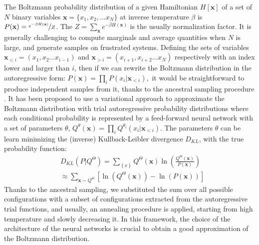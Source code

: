\documentclass[aps,physrev,10pt,floatfix,reprint]{revtex4-2}
\begin{document}
The Boltzmann probability distribution of a given Hamiltonian $H[\mathbf{x}]$ of a set of $N$ binary variables $\mathbf{x}=\{x_1, x_2,...x_N\}$ at inverse temperature $\beta$ is $P(\mathbf{x}) = \nicefrac{e^{-\beta H\left(\mathbf{x}\right)}}{Z}$. The $Z=\sum_{\mathbf{x}}e^{-\beta H\left(\mathbf{x}\right)}$ is the usually normalization factor.
It is generally challenging to compute marginals and average quantities when $N$ is large, and generate samples on frustrated systems. Defining the sets of variables $\mathbf{x}_{<i}=\left(x_{1},x_{2}\dots x_{i-1}\right)$ and $\mathbf{x}_{>i}=\left(x_{i+1},x_{i+2}\dots x_{N}\right)$ respectively with an index lower and larger than $i$, then if we can rewrite the Boltzmann distribution in the autoregressive form:
$
P\left(\mathbf{x}\right)=\prod_{i}P\left(x_{i}|\mathbf{x}_{<i}\right),
$
it would be straightforward to produce independent samples from it, thanks to the ancestral sampling procedure \cite{Wu2019}. It has been proposed \cite{Wu2019} to use a variational approach to approximate the Boltzmann distribution with trial autoregressive probability distributions where each conditional probability is represented by a feed-forward neural network with a set of parameters ${\theta}$,
$
Q^{\theta}\left(\mathbf{x}\right)=\prod_{i}Q^{\theta_i}\left(x_{i}|\mathbf{x}_{<i}\right)
$.
The parameters ${\theta}$ can be learn minimizing the (inverse) Kullback-Leibler divergence $D_{KL}$,
with the true probability function:
\begin{equation}
\begin{split}
& D_{KL}\left(P|Q^{\Theta}\right) =  \sum_{\left\{ x\right\} }Q^{\Theta}\left(\mathbf{x} \right)\ln\left(\frac{Q^{\Theta}\left(\mathbf{x} \right)}{P\left(\mathbf{x} \right)}\right)  \\
& \approx \sum_{\mathbf{x}\sim Q^{\Theta}}\left[\ln\left(Q^{\Theta}\left(\mathbf{x} \right)\right)-\ln\left(P\left(\mathbf{x} \right)\right)\right]
\end{split}    
\end{equation}
Thanks to the ancestral sampling, we substituted the sum over all possible configurations with a subset of configurations extracted from the autoregressive trial functions, and usually, an annealing procedure is applied, starting from high temperature and slowly decreasing it.
In this framework, the choice of the architecture of the neural networks is crucial to obtain a good approximation of the Boltzmann distribution.
\end{document}
